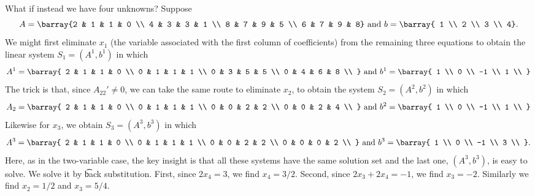 What if instead we have four unknowns?
Suppose
    \[
A = \barray{2 & 1 & 1 & 0 \\ 4 & 3 & 3 & 1 \\ 8 & 7 & 9 & 5 \\ 6 & 7 & 9 & 8} \text{ and } b = \barray{ 1 \\ 2 \\ 3 \\ 4}.
    \]
We might first eliminate $x_1$ (the variable associated with the first column of coefficients) from the remaining three equations to obtain the linear system $S_1 = (A^1, b^1)$ in which
    \[
A^1 = \barray{
2 & 1 & 1 & 0 \\
0 & 1 & 1 & 1 \\
0 & 3 & 5 & 5 \\
0 & 4 & 6 & 8 \\
} \text{ and } b^1 = \barray{
1 \\
0 \\
-1 \\
1 \\
}
    \]
The trick is that, since $A_{22}' \neq 0$, we can take the same route to eliminate $x_2$, to obtain the system $S_2 = (A^2, b^2)$ in which
    \[
A_2 = \barray{
2 & 1 & 1 & 0 \\
0 & 1 & 1 & 1 \\
0 & 0 & 2 & 2 \\
0 & 0 & 2 & 4 \\
} \text{ and } b^2 = \barray{
1 \\
0 \\
-1 \\
1 \\
}
    \]
Likewise for $x_3$, we obtain $S_3 = (A^3, b^3)$ in which
      \[
A^3 = \barray{
2 & 1 & 1 & 0 \\
0 & 1 & 1 & 1 \\
0 & 0 & 2 & 2 \\
0 & 0 & 0 & 2 \\
} \text{ and } b^3 = \barray{
1 \\
0 \\
-1 \\
3 \\
}.
      \]
Here, as in the two-variable case, the key insight is that all these systems have the same solution set and the last one, $(A^3, b^3)$, is easy to solve.
We solve it by \t{back substitution}.
First, since $2x_4 = 3$, we find $x_4 = 3/2$.
Second, since $2x_3 + 2x_4 = -1$, we find $x_3 = -2$.
Similarly we find $x_2 = 1/2$ and $x_3 = 5/4$.

